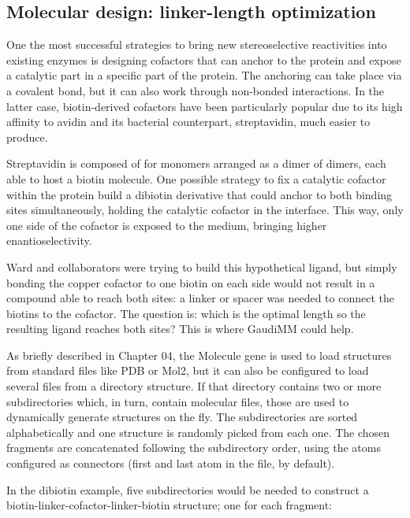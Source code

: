 \subsection{Molecular design: linker-length optimization}
\label{section:dibiotin-linker-length-optimization}
One the most successful strategies to bring new stereoselective reactivities into existing enzymes is designing cofactors that can anchor to the protein and expose a catalytic part in a specific part of the protein. The anchoring can take place via a covalent bond, but it can also work through non-bonded interactions. In the latter case, biotin-derived cofactors have been particularly popular due to its high affinity to avidin and its bacterial counterpart, streptavidin, much easier to produce.

Streptavidin is composed of for monomers arranged as a dimer of dimers, each able to host a biotin molecule. One possible strategy to fix a catalytic cofactor within the protein build a dibiotin derivative that could anchor to both binding sites simultaneously, holding the catalytic cofactor in the interface. This way, only one side of the cofactor is exposed to the medium, bringing higher enantioselectivity.

Ward and collaborators were trying to build this hypothetical ligand, but simply bonding the copper cofactor to one biotin on each side would not result in a compound able to reach both sites: a linker or spacer was needed to connect the biotins to the cofactor. The question is: which is the optimal length so the resulting ligand reaches both sites? This is where GaudiMM could help.

As briefly described in Chapter 04, the Molecule gene is used to load structures from standard files like PDB or Mol2, but it can also be configured to load several files from a directory structure. If that directory contains two or more subdirectories which, in turn, contain molecular files, those are used to dynamically generate structures on the fly. The subdirectories are sorted alphabetically and one structure is randomly picked from each one. The chosen fragments are concatenated following the subdirectory order, using the atoms configured as connectors (first and last atom in the file, by default).

In the dibiotin example, five subdirectories would be needed to construct a biotin-linker-cofactor-linker-biotin structure; one for each fragment:

